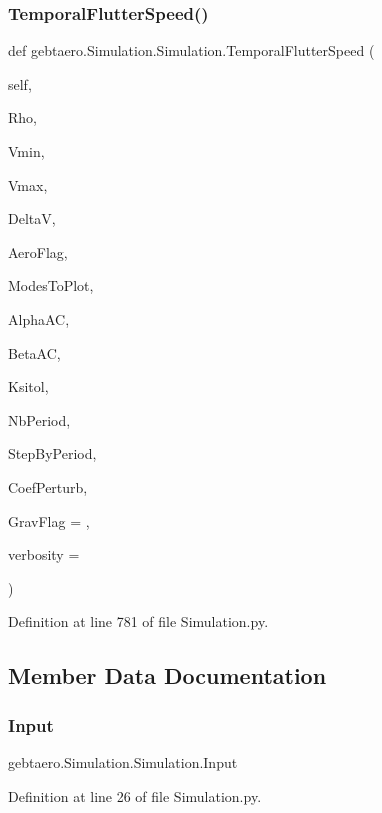 \subsubsection{\texorpdfstring{Temporal\+Flutter\+Speed()}{TemporalFlutterSpeed()}}
{\footnotesize\ttfamily def gebtaero.\+Simulation.\+Simulation.\+Temporal\+Flutter\+Speed (\begin{DoxyParamCaption}\item[{}]{self,  }\item[{}]{Rho,  }\item[{}]{Vmin,  }\item[{}]{Vmax,  }\item[{}]{DeltaV,  }\item[{}]{Aero\+Flag,  }\item[{}]{Modes\+To\+Plot,  }\item[{}]{Alpha\+AC,  }\item[{}]{Beta\+AC,  }\item[{}]{Ksitol,  }\item[{}]{Nb\+Period,  }\item[{}]{Step\+By\+Period,  }\item[{}]{Coef\+Perturb,  }\item[{}]{Grav\+Flag = {},  }\item[{}]{verbosity = {} }\end{DoxyParamCaption})}



Definition at line 781 of file Simulation.\+py.



\subsection{Member Data Documentation}
\mbox{\label{classgebtaero_1_1_simulation_1_1_simulation_ad5005a77e6335eaefeec0af47edc46dc}} 
\subsubsection{\texorpdfstring{Input}{Input}}
{\footnotesize\ttfamily gebtaero.\+Simulation.\+Simulation.\+Input}



Definition at line 26 of file Simulation.\+py.

